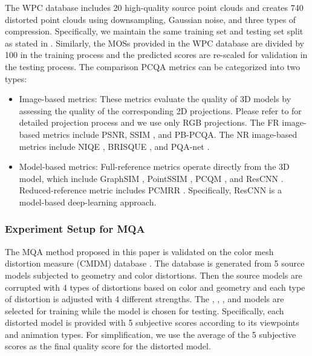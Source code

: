 \documentclass[lettersize,journal]{IEEEtran}
\begin{document}
{The WPC database includes 20 high-quality source point clouds and creates 740 distorted point clouds using downsampling, Gaussian noise, and three types of compression. Specifically, we maintain the same training set and testing set split as stated in \cite{liu2021pqa}. Similarly, the MOSs provided in the WPC database are divided by 100 in the training process and the predicted scores are re-scaled for validation in the testing process.
The comparison PCQA metrics can be categorized into two types:}





\begin{itemize}
    \item  Image-based metrics: These metrics evaluate the quality of 3D models by assessing the quality of the corresponding 2D projections. Please refer to \cite{sjtu-pcqa} for detailed projection process and we use only RGB projections. The FR image-based metrics include PSNR, SSIM \cite{ssim}, and PB-PCQA\cite{sjtu-pcqa}. The NR image-based metrics include NIQE \cite{niqe}, BRISQUE \cite{brisque}, and PQA-net \cite{liu2021pqa}.

    \item Model-based metrics: Full-reference metrics operate directly from the 3D model, which include GraphSIM \cite{yang2020inferring}, PointSSIM \cite{pcqa3}, PCQM \cite{pcqm}, and ResCNN \cite{pcqa-large-scale}. Reduced-reference metric includes PCMRR \cite{viola2020reduced}. Specifically, ResCNN is a model-based deep-learning approach. 
\end{itemize}










\subsubsection{Experiment Setup for MQA}
The MQA method proposed in this paper is validated on the color mesh distortion measure (CMDM) database \cite{database}. The database is generated from 5 source models subjected to geometry and color distortions. Then the source models are corrupted with 4 types of distortions based on color and geometry and each type of distortion is adjusted with 4 different strengths. The , , , and  models are selected for training while the  model is chosen for testing. Specifically, each distorted model is provided with 5 subjective scores according to its viewpoints and animation types. For simplification, we use the average of the 5 subjective scores as the final quality score for the distorted model.
\end{document}
